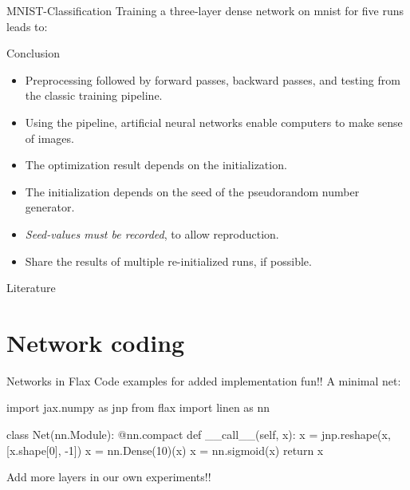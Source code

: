\documentclass{beamer}
\begin{document}
    \begin{frame}{MNIST-Classification}
      Training a three-layer dense network on mnist for five runs leads to:
      \begin{figure}
        
      \end{figure}
    \end{frame}

    \begin{frame}{Conclusion}
      \begin{itemize}
        \item Preprocessing followed by forward passes, backward passes, and testing from the classic training pipeline.
        \item Using the pipeline, artificial neural networks enable computers to make sense of images.
        \item The optimization result depends on the initialization.
        \item The initialization depends on the seed of the pseudorandom number generator.
        \item \textit{Seed-values must be recorded}, to allow reproduction.
        \item Share the results of multiple re-initialized runs, if possible.
      \end{itemize}
    \end{frame}

    \begin{frame}[allowframebreaks]{Literature}
      \printbibliography
    \end{frame}

    \section{Network coding}
    \begin{frame}[fragile]{Networks in Flax}
      Code examples for added implementation fun!! A minimal net:
      \begin{python}
      import jax.numpy as jnp
      from flax import linen as nn

      class Net(nn.Module):
      @nn.compact
      def __call__(self, x):
          x = jnp.reshape(x,
              [x.shape[0], -1])
          x = nn.Dense(10)(x)
          x = nn.sigmoid(x)
          return x
      \end{python}
      Add more layers in our own experiments!!
    \end{frame}
\end{document}
